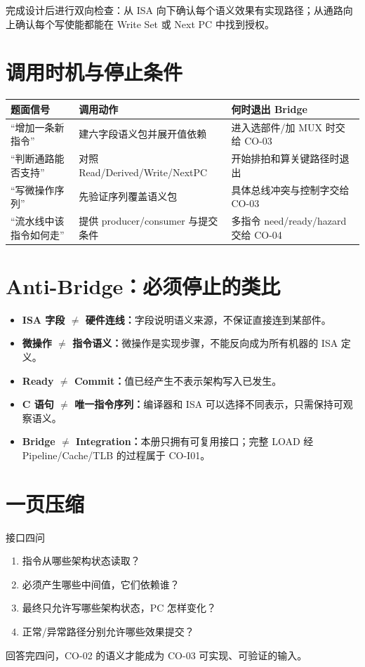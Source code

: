 \documentclass[UTF8,fontset=fandol,11pt,a4paper]{ctexart}
\newcommand{\kw}[1]{\textbf{\color{deep}#1}}
\begin{document}
完成设计后进行双向检查：从 ISA 向下确认每个语义效果有实现路径；从通路向上确认每个写使能都能在 Write Set 或 Next PC 中找到授权。

\section{调用时机与停止条件}

\begin{center}
\small
\begin{tabularx}{\linewidth}{L{3.2cm}Y Y}
\toprule
题面信号 & 调用动作 & 何时退出 Bridge\\
\midrule
“增加一条新指令” & 建六字段语义包并展开值依赖 & 进入选部件/加 MUX 时交给 CO-03\\
“判断通路能否支持” & 对照 Read/Derived/Write/NextPC & 开始排拍和算关键路径时退出\\
“写微操作序列” & 先验证序列覆盖语义包 & 具体总线冲突与控制字交给 CO-03\\
“流水线中该指令如何走” & 提供 producer/consumer 与提交条件 & 多指令 need/ready/hazard 交给 CO-04\\
\bottomrule
\end{tabularx}
\end{center}

\section{Anti-Bridge：必须停止的类比}

\begin{itemize}
  \item \kw{ISA 字段 $\neq$ 硬件连线：}字段说明语义来源，不保证直接连到某部件。
  \item \kw{微操作 $\neq$ 指令语义：}微操作是实现步骤，不能反向成为所有机器的 ISA 定义。
  \item \kw{Ready $\neq$ Commit：}值已经产生不表示架构写入已发生。
  \item \kw{C 语句 $\neq$ 唯一指令序列：}编译器和 ISA 可以选择不同表示，只需保持可观察语义。
  \item \kw{Bridge $\neq$ Integration：}本册只拥有可复用接口；完整 LOAD 经 Pipeline/Cache/TLB 的过程属于 CO-I01。
\end{itemize}

\section{一页压缩}

\begin{corebox}{接口四问}
\begin{enumerate}
  \item 指令从哪些架构状态读取？
  \item 必须产生哪些中间值，它们依赖谁？
  \item 最终只允许写哪些架构状态，PC 怎样变化？
  \item 正常/异常路径分别允许哪些效果提交？
\end{enumerate}
回答完四问，CO-02 的语义才能成为 CO-03 可实现、可验证的输入。
\end{corebox}
\end{document}
